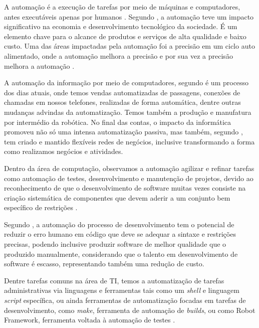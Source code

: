 \documentclass[tg]{mdtufsm}
\begin{document}
	A automação é a execução de tarefas por meio de máquinas e computadores, antes executáveis apenas por humanos \cite{automationlevels}.	Segundo \citeauthor{automation2009} \cite[pág. 124]{automation2009}, a automação teve um impacto significativo na economia e desenvolvimento tecnológico da sociedade. É um elemento chave para o alcance de produtos e serviços de alta qualidade e baixo custo. Uma das áreas impactadas pela automação foi a precisão em um ciclo auto alimentado, onde a automação melhora a precisão e por sua vez a precisão melhora a automação \cite{auto2008precision}.

	A automação da informação por meio de computadores, segundo \citeauthor{automation2009} \cite[pág. 3]{automation2009} é  um processo dos dias atuais, onde temos vendas automatizadas de passagens, conexões de chamadas em nossos telefones, realizadas de forma automática, dentre outras mudanças advindas da automatização. Temos também a produção e manufatura por intermédio da robótica. No final das contas, o impacto da informática promoveu não só uma intensa automatização passiva, mas também, segundo \citeauthor{itEnabledBusiness}\cite{itEnabledBusiness}, tem criado e mantido flexíveis redes de negócios, inclusive transformando a forma como realizamos negócios e atividades.

	Dentro da área de computação, observamos a automação agilizar e refinar tarefas como automação de testes, desenvolvimento e manutenção de projetos, devido ao reconhecimento de que o desenvolvimento de software muitas vezes consiste na criação sistemática de componentes que devem aderir a um conjunto bem específico de restrições \cite{automionSoftEvolutionEffect}.

	Segundo \citeauthor{automionSoftEvolutionEffect}\cite{automionSoftEvolutionEffect}, a automação do processo de desenvolvimento tem o potencial de reduzir o erro humano em código que deve se adequar a sintaxe e restrições precisas, podendo inclusive produzir software de melhor qualidade que o produzido manualmente, considerando que o talento em desenvolvimento de software é escasso, representando também uma redução de custo.

	Dentre tarefas comuns na área de TI, temos a automatização de tarefas administrativas via linguagens e ferramentas tais como um \emph{shell} e linguagem \emph{script} específica, ou ainda ferramentas de automatização focadas em tarefas de desenvolvimento, como \emph{make}, ferramenta de automação de \emph{builds}, ou como Robot Framework, ferramenta voltada à automação de testes \cite{shell,make,robotFW}.
\end{document}
